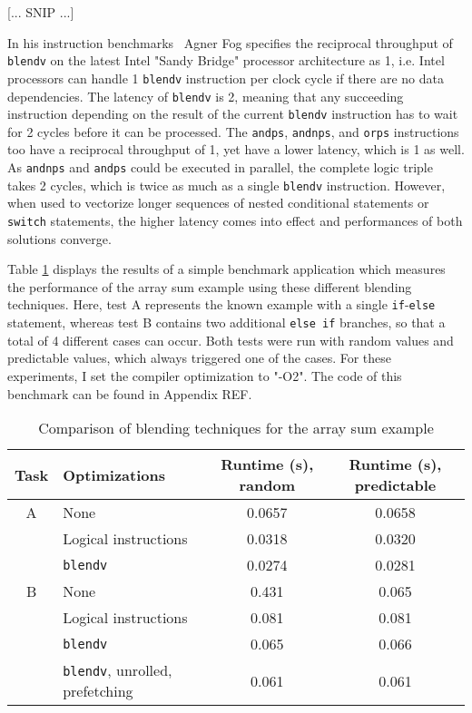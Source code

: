 [... SNIP ...]

In his instruction benchmarks~\cite[p. 44]{fog2011instructiontables} Agner Fog specifies the reciprocal throughput of \texttt{blendv} on the latest Intel "Sandy Bridge" processor architecture as 1, i.e. Intel processors can handle 1 \texttt{blendv} instruction per clock cycle if there are no data dependencies. The latency of \texttt{blendv} is 2, meaning that any succeeding instruction depending on the result of the current \texttt{blendv} instruction has to wait for 2 cycles before it can be processed. The \texttt{andps}, \texttt{andnps}, and \texttt{orps} instructions too have a reciprocal throughput of 1, yet have a lower latency, which is 1 as well. As \texttt{andnps} and \texttt{andps} could be executed in parallel, the complete logic triple takes 2 cycles, which is twice as much as a single \texttt{blendv} instruction. However, when used to vectorize longer sequences of nested conditional statements or \texttt{switch} statements, the higher latency comes into effect and performances of both solutions converge.

Table \ref{blending_table} displays the results of a simple benchmark application which measures the performance of the array sum example using these different blending techniques. Here, test A represents the known example with a single \texttt{if}-\texttt{else} statement, whereas test B contains two additional \texttt{else if} branches, so that a total of 4 different cases can occur. Both tests were run with random values and predictable values, which always triggered one of the cases. For these experiments, I set the compiler optimization to "-O2". The code of this benchmark can be found in Appendix REF. 

\begin{table}[h]
\begin{center}
\begin{tabular}{clcc}
\toprule
Task & Optimizations & Runtime (s), random & Runtime (s), predictable \\
\midrule
A & None & 0.0657 & 0.0658 \\
& Logical instructions & 0.0318 & 0.0320 \\
& \texttt{blendv} & 0.0274 & 0.0281 \\
\addlinespace
B & None & 0.431 & 0.065 \\
& Logical instructions & 0.081 & 0.081 \\
& \texttt{blendv} & 0.065 & 0.066 \\
& \texttt{blendv}, unrolled, prefetching & 0.061 & 0.061 \\
\bottomrule
\end{tabular}
\caption{Comparison of blending techniques for the array sum example}
\label{blending_table}
\end{center}
\end{table}

